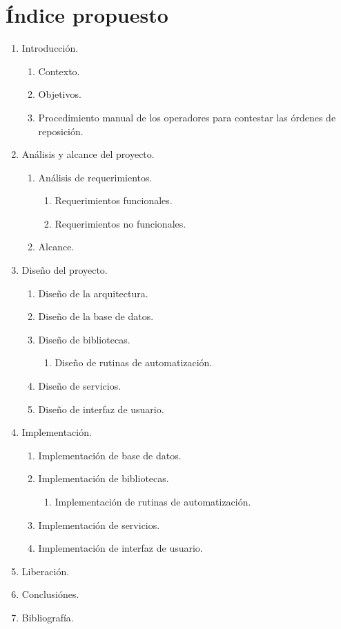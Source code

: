 \documentclass[letterpaper,11pt]{article}
\begin{document}
\section{Índice propuesto}
\renewcommand{\labelenumii}{\arabic{enumi}.\arabic{enumii}.}
\renewcommand{\labelenumiii}{\arabic{enumi}.\arabic{enumii}.\arabic{enumiii}.}
\begin{enumerate}
  \item Introducción.
  \begin{enumerate}
    \item Contexto.
    \item Objetivos.
    \item Procedimiento manual de los operadores para contestar las órdenes de reposición.
  \end{enumerate}
  \item Análisis y alcance del proyecto.
  \begin{enumerate}
    \item Análisis de requerimientos.
    \begin{enumerate}
      \item Requerimientos funcionales.
      \item Requerimientos no funcionales.
    \end{enumerate}
    \item Alcance.
  \end{enumerate}
\item Diseño del proyecto.
\begin{enumerate}
  \item Diseño de la arquitectura.
  \item Diseño de la base de datos.
  \item Diseño de bibliotecas.
  \begin{enumerate}
    \item Diseño de rutinas de automatización.
  \end{enumerate}
  \item Diseño de servicios.
  \item Diseño de interfaz de usuario.
\end{enumerate}
\item Implementación.
\begin{enumerate}
  \item Implementación de base de datos.
  \item Implementación de bibliotecas.
  \begin{enumerate}
    \item Implementación de rutinas de automatización.
  \end{enumerate}
  \item Implementación de servicios.
  \item Implementación de interfaz de usuario.
\end{enumerate}
\item Liberación.
\item Conclusiónes.
\item Bibliografía.
\end{enumerate}
\end{document}
